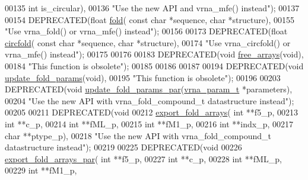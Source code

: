 \begin{DoxyCode}
00135           \textcolor{keywordtype}{int} is\_circular),
00136 \textcolor{stringliteral}{"Use the new API and vrna\_mfe() instead"});
00137 
00154 DEPRECATED(\textcolor{keywordtype}{float} \hyperlink{group__mfe__fold__single_gaadafcb0f140795ae62e5ca027e335a9b}{fold}( \textcolor{keyword}{const} \textcolor{keywordtype}{char} *sequence, \textcolor{keywordtype}{char} *structure),
00155 \textcolor{stringliteral}{"Use vrna\_fold() or vrna\_mfe() instead"});
00156 
00173 DEPRECATED(\textcolor{keywordtype}{float} \hyperlink{group__mfe__fold__single_ga4ac63ab3e8d9a80ced28b8052d94e423}{circfold}( \textcolor{keyword}{const} \textcolor{keywordtype}{char} *sequence, \textcolor{keywordtype}{char} *structure),
00174 \textcolor{stringliteral}{"Use vrna\_circfold() or vrna\_mfe() instead"});
00175 
00176 
00183 DEPRECATED(\textcolor{keywordtype}{void} \hyperlink{group__mfe__fold__single_ga107fdfe5fd641868156bfd849f6866c7}{free\_arrays}(\textcolor{keywordtype}{void}),
00184 \textcolor{stringliteral}{"This function is obsolete"});
00185 
00186 
00187 
00194 DEPRECATED(\textcolor{keywordtype}{void} \hyperlink{group__mfe__fold__single_ga41bf8f6fa15b94471f7095cad9f0ccf3}{update\_fold\_params}(\textcolor{keywordtype}{void}),
00195 \textcolor{stringliteral}{"This function is obsolete"});
00196 
00203 DEPRECATED(\textcolor{keywordtype}{void} \hyperlink{group__mfe__fold__single_gae66dc422efb8f5d56717d92d6002a9f8}{update\_fold\_params\_par}(\hyperlink{group__energy__parameters_structvrna__param__s}{vrna\_param\_t} *parameters),
00204 \textcolor{stringliteral}{"Use the new API with vrna\_fold\_compound\_t datastructure instead"});
00205 
00211 DEPRECATED(\textcolor{keywordtype}{void}
00212 \hyperlink{group__mfe__fold__single_ga99641b8dbb40891da5490d3cc271e607}{export\_fold\_arrays}( \textcolor{keywordtype}{int} **f5\_p,
00213                     \textcolor{keywordtype}{int} **c\_p,
00214                     \textcolor{keywordtype}{int} **fML\_p,
00215                     \textcolor{keywordtype}{int} **fM1\_p,
00216                     \textcolor{keywordtype}{int} **indx\_p,
00217                     \textcolor{keywordtype}{char} **ptype\_p),
00218 \textcolor{stringliteral}{"Use the new API with vrna\_fold\_compound\_t datastructure instead"});
00219 
00225 DEPRECATED(\textcolor{keywordtype}{void}
00226 \hyperlink{group__mfe__fold__single_ga6606ec0ec964ea506fdadb997a1a5328}{export\_fold\_arrays\_par}( \textcolor{keywordtype}{int} **f5\_p,
00227                         \textcolor{keywordtype}{int} **c\_p,
00228                         \textcolor{keywordtype}{int} **fML\_p,
00229                         \textcolor{keywordtype}{int} **fM1\_p,

\end{DoxyCode}
